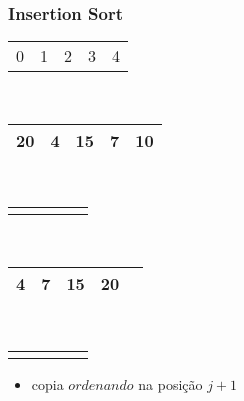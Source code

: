 \documentclass{beamer}
\begin{document}
\begin{frame}
    \frametitle{Insertion Sort}
    \begin{center}
        \begin{table}
            \begin{tabular}{p{0.25cm} p{0.25cm} p{0.25cm} p{0.25cm} p{0.25cm}}
                0 & 1 & 2 & 3 & 4
            \end{tabular} \\
            \begin{tabular}{| p{0.25cm} | p{0.25cm} | p{0.25cm} | p{0.25cm} | p{0.25cm} |}
                \hline
                20 & 4 & 15 & 7 & 10 \\ \hline
            \end{tabular} \\
            \begin{tabular}{p{0.25cm} p{0.25cm} p{0.25cm} p{0.25cm} p{0.25cm}}
                & & & \color{green}{$\uparrow$} &
            \end{tabular} \\
            \begin{tabular}{| p{0.25cm} | p{0.25cm} | p{0.25cm} | p{0.25cm} | p{0.25cm} |}
                \hline
                4 & 7 & 15 & 20 & \\ \hline
            \end{tabular} \\
            \begin{tabular}{p{0.25cm} p{0.25cm} p{0.25cm} p{0.25cm} p{0.25cm}}
                & \color{blue}{$\uparrow$} &  & &
            \end{tabular}
        \end{table}
	\end{center}
    \color{green}{$ordenando = 7$}
    \begin{itemize}[<+->]
        \item copia $ordenando$ na posição $j + 1$
    \end{itemize}
\end{frame}
\end{document}
